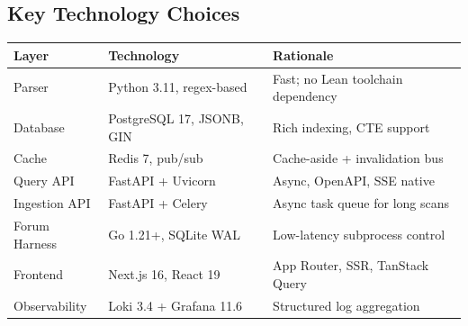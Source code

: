 \subsection{Key Technology Choices}

\begin{tabular}{@{}lll@{}}
\toprule
\textbf{Layer}       & \textbf{Technology}            & \textbf{Rationale} \\
\midrule
Parser               & Python 3.11, regex-based       & Fast; no Lean toolchain dependency \\
Database             & PostgreSQL 17, JSONB, GIN      & Rich indexing, CTE support \\
Cache                & Redis 7, pub/sub               & Cache-aside + invalidation bus \\
Query API            & FastAPI + Uvicorn              & Async, OpenAPI, SSE native \\
Ingestion API        & FastAPI + Celery               & Async task queue for long scans \\
Forum Harness        & Go 1.21+, SQLite WAL           & Low-latency subprocess control \\
Frontend             & Next.js 16, React 19           & App Router, SSR, TanStack Query \\
Observability        & Loki 3.4 + Grafana 11.6        & Structured log aggregation \\
\bottomrule
\end{tabular}

